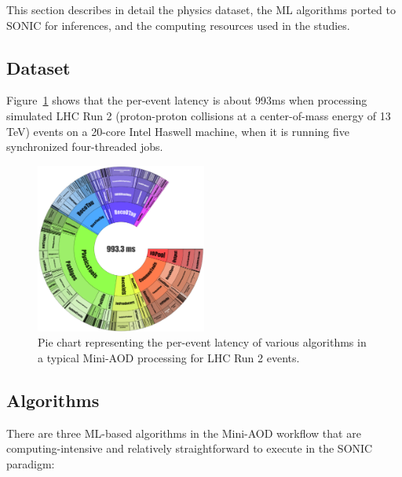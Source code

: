 

This section describes in detail the physics dataset, the ML algorithms ported to SONIC for inferences, and the computing resources used in the studies.

\subsection{Dataset}
Figure~\ref{fig:algorithms} shows that the per-event latency is about 993\unit{ms} when processing simulated LHC Run 2 (proton-proton collisions at a center-of-mass energy of 13 TeV) \ttbar events on a 20-core Intel Haswell machine, when it is running five synchronized four-threaded jobs.

\begin{figure}[htp]
    \centering
    \includegraphics[width=0.50\textwidth]{plots/Step2_pieChart.pdf}
    \caption{Pie chart representing the per-event latency of various algorithms in a typical Mini-AOD processing for LHC Run 2 \ttbar events.}
    \label{fig:algorithms}
\end{figure}

\subsection{Algorithms}

There are three ML-based algorithms in the Mini-AOD workflow that are computing-intensive and relatively straightforward to execute in the SONIC paradigm:

